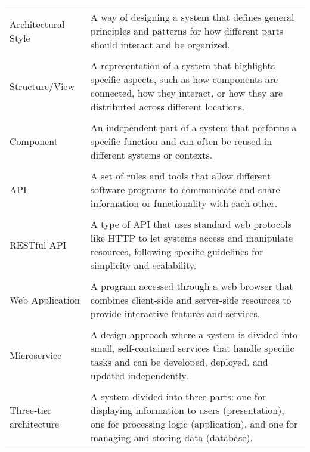 \begin{longtable}{p{}p{}}
    \vspace{0.5em}\\
    Architectural Style & A way of designing a system that defines general principles and patterns for how different
    parts should interact and be organized. \\
    
    \vspace{0.5em}\\
    Structure/View & A representation of a system that highlights specific aspects, such as how components are connected,
    how they interact, or how they are distributed across different locations. \\
    
    \vspace{0.5em}\\
    Component & An independent part of a system that performs a specific function and can often be reused in different
    systems or contexts. \\
    
    \vspace{0.5em}\\
    API & A set of rules and tools that allow different software programs to communicate and share information or
    functionality with each other. \\
    
    \vspace{0.5em}\\
    RESTful API & A type of API that uses standard web protocols like HTTP to let systems access and manipulate resources,
    following specific guidelines for simplicity and scalability. \\
    
    \vspace{0.5em}\\
    Web Application & A program accessed through a web browser that combines client-side and server-side resources to
    provide interactive features and services. \\
    
    \vspace{0.5em}\\
    Microservice & A design approach where a system is divided into small, self-contained services that handle specific
    tasks and can be developed, deployed, and updated independently. \\
    
    \vspace{0.5em}\\
    Three-tier architecture & A system divided into three parts: one for displaying information to users (presentation),
    one for processing logic (application), and one for managing and storing data (database). \\
    

\end{longtable}
